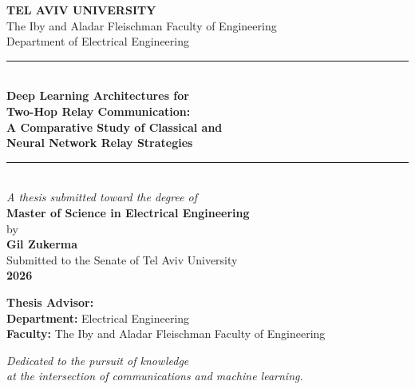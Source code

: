 \documentclass[12pt,a4paper,oneside]{book}
\theoremstyle{definition}
\begin{document}
\begin{titlepage}
\begin{center}
\vspace*{0.5cm}

{\LARGE\textbf{TEL AVIV UNIVERSITY}}\\[6pt]
{\large The Iby and Aladar Fleischman Faculty of Engineering}\\[4pt]
{\large Department of Electrical Engineering}\\[1.5cm]

\noindent\rule{\textwidth}{2pt}\\[0.4cm]
{\LARGE\bfseries\color{tauBlue}
Deep Learning Architectures for\\[6pt]
Two-Hop Relay Communication:\\[6pt]
A Comparative Study of Classical and\\[6pt]
Neural Network Relay Strategies}\\[0.4cm]
\noindent\rule{\textwidth}{2pt}\\[1.2cm]

{\large\textit{A thesis submitted toward the degree of}}\\[4pt]
{\large\textbf{Master of Science in Electrical Engineering}}\\[1.5cm]

{\large by}\\[6pt]
{\Large\bfseries Gil Zukerma}\\[1.5cm]

{\large Submitted to the Senate of Tel Aviv University}\\[4pt]
{\large\textbf{2026}}\\[1.5cm]

\vfill
\begin{flushleft}
\textbf{Thesis Advisor:} \\[4pt]
\textbf{Department:} \quad Electrical Engineering\\[4pt]
\textbf{Faculty:} \quad The Iby and Aladar Fleischman Faculty of Engineering
\end{flushleft}
\end{center}
\end{titlepage}

\frontmatter
{}

\clearpage
\thispagestyle{empty}
\vspace*{5cm}
\begin{center}
\textit{Dedicated to the pursuit of knowledge\\
at the intersection of communications and machine learning.}
\end{center}
\clearpage
\end{document}

